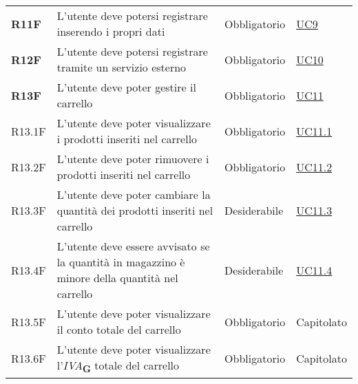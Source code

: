 \begin{center}
\begin{longtable}[!h]{p{50px} p{245px} p{75px} p{50px}}
        \textbf{R11F}                         & L'utente deve potersi registrare inserendo i propri dati                                                                                               & Obbligatorio             & \hyperref[sec:UC9]{UC9}                      \\
        \textbf{R12F}                         & L'utente deve potersi registrare tramite un servizio esterno                                                                                           & Obbligatorio             & \hyperref[sec:UC10]{UC10}                    \\
        \textbf{R13F}                         & L'utente deve poter gestire il carrello                                                                                                                & Obbligatorio             & \hyperref[sec:UC11]{UC11}                    \\
        R13.1F                                & L'utente deve poter visualizzare i prodotti inseriti nel carrello                                                                                      & Obbligatorio             & \hyperref[sec:UC11.1]{UC11.1}                \\
        R13.2F                                & L'utente deve poter rimuovere i prodotti inseriti nel carrello                                                                                         & Obbligatorio             & \hyperref[sec:UC11.2]{UC11.2}                \\
        R13.3F                                & L'utente deve poter cambiare la quantità dei prodotti inseriti nel carrello                                                                            & Desiderabile             & \hyperref[sec:UC11.3]{UC11.3}                \\
        R13.4F                                & L'utente deve essere avvisato se la quantità in magazzino è minore della quantità nel carrello                                                         & Desiderabile             & \hyperref[sec:UC11.4]{UC11.4}                \\
        R13.5F                                & L'utente deve poter visualizzare il conto totale del carrello                                                                                          & Obbligatorio             & Capitolato                                   \\
        R13.6F                                & L'utente deve poter visualizzare l'\textit{IVA}\textsubscript{\textbf{G}} totale del carrello                                                          & Obbligatorio             & Capitolato                                   \\

\end{longtable}
\end{center}
